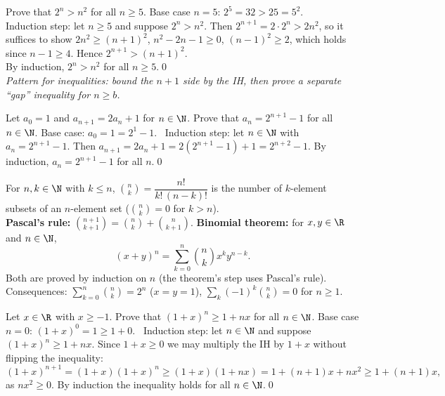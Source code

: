 \begin{hexample}
Prove that $2^n>n^2$ for all $n\ge5$.
\solution
Base case $n=5$: $2^5=32>25=5^2$.\\
Induction step: let $n\ge5$ and suppose $2^n>n^2$. Then $2^{n+1}=2\cdot2^n>2n^2$, so it suffices to show $2n^2\ge(n+1)^2$, \ie $n^2-2n-1\ge0$, \ie $(n-1)^2\ge2$, which holds since $n-1\ge4$. Hence $2^{n+1}>(n+1)^2$.\\
By induction, $2^n>n^2$ for all $n\ge5$.\qed\\
\emph{Pattern for inequalities: bound the $n+1$ side by the IH, then prove a separate ``gap'' inequality for $n\ge b$.}
\end{hexample}

\begin{hexample}
Let $a_0=1$ and $a_{n+1}=2a_n+1$ for $n\in\N$. Prove that $a_n=2^{n+1}-1$ for all $n\in\N$.
\solution
Base case: $a_0=1=2^1-1$. \ Induction step: let $n\in\N$ with $a_n=2^{n+1}-1$. Then $a_{n+1}=2a_n+1=2(2^{n+1}-1)+1=2^{n+2}-1$. By induction, $a_n=2^{n+1}-1$ for all $n$.\qed
\end{hexample}

\begin{key}
For $n,k\in\N$ with $k\le n$, $\binom nk=\dfrac{n!}{k!\,(n-k)!}$ is the number of $k$-element subsets of an $n$-element set ($\binom nk=0$ for $k>n$).\\
\textbf{Pascal's rule:} $\binom{n+1}{k+1}=\binom nk+\binom n{k+1}$. \quad \textbf{Binomial theorem:} for $x,y\in\R$ and $n\in\N$,
\[
(x+y)^n=\sum_{k=0}^n\binom nk x^k y^{n-k}.
\]
Both are proved by induction on $n$ (the theorem's step uses Pascal's rule). Consequences: $\sum_{k=0}^n\binom nk=2^n$ ($x=y=1$), $\sum_{k}(-1)^k\binom nk=0$ for $n\ge1$.
\end{key}

\begin{hexample}
Let $x\in\R$ with $x\ge-1$. Prove that $(1+x)^n\ge1+nx$ for all $n\in\N$.
\solution
Base case $n=0$: $(1+x)^0=1\ge1+0$. \ Induction step: let $n\in\N$ and suppose $(1+x)^n\ge1+nx$. Since $1+x\ge0$ we may multiply the IH by $1+x$ without flipping the inequality:
\[
(1+x)^{n+1}=(1+x)(1+x)^n\ge(1+x)(1+nx)=1+(n+1)x+nx^2\ge1+(n+1)x,
\]
as $nx^2\ge0$. By induction the inequality holds for all $n\in\N$.\qed
\end{hexample}

